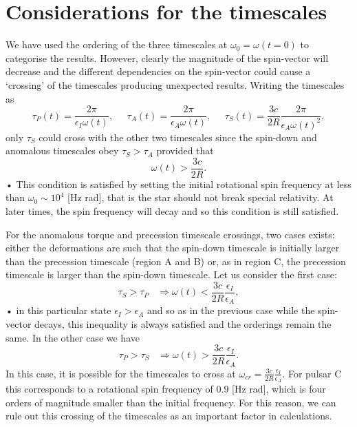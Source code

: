 \section{Considerations for the timescales}\label{sec: timescales}
We have used the ordering of the three timescales at $\omega_{0}=\omega(t=0)$
to categorise the results. However, clearly the magnitude of the spin-vector
will decrease and the different dependencies on the spin-vector could cause a
`crossing' of the timescales producing unexpected results. Writing the
timescales as 
\begin{equation}
\tau_{P}(t)=\frac{2\pi}{\epsilon_{I}\omega(t)}, \;\;\;\;\; 
\tau_{A}(t)=\frac{2\pi}{\epsilon_{A}\omega(t)},  \;\;\;\;\; 
\tau_{S}(t)=\frac{3c}{2R}\frac{2\pi}{\epsilon_{A}\omega(t)^{2}},
\end{equation}
only $\tau_{S}$ could cross with the other two timescales since the spin-down
and anomalous timescales obey $\tau_{S}>\tau_{A}$ provided that 
\begin{equation*}
\omega(t)>\frac{3c}{2R}.
\end{equation*}•
This condition is satisfied by setting the initial rotational spin frequency at
less than $\omega_{0} \sim 10^{4}$ [Hz rad], that is the star should not break
special relativity. At later times, the spin frequency will decay and so this
condition is still satisfied.

For the anomalous torque and precession timescale crossings, two cases exists:
either the deformations are such that the spin-down timescale is initially larger than
the precession timescale (region A and B) or, as in region C, the precession
timescale is larger than the spin-down timescale. Let us consider the first case:
\begin{equation}
\tau_{S}>\tau_{P} \;\;\; 
\Rightarrow \omega(t)<\frac{3c}{2R}\frac{\epsilon_{I}}{\epsilon_{A}},
\end{equation}•
in this particular state $\epsilon_{I}>\epsilon_{A}$ and so as in the previous
case while the spin-vector decays, this inequality is always satisfied and the
orderings remain the same. In the other case we have
\begin{equation}
\tau_{P}>\tau_{S} \;\;\; 
\Rightarrow \omega(t)>\frac{3c}{2R}\frac{\epsilon_{I}}{\epsilon_{A}}.
\end{equation}
In this case, it is possible for the timescales to cross at
$\omega_{cr}=\frac{3c}{2R}\frac{\epsilon_{I}}{\epsilon_{A}}$. For pulsar C this
corresponds to a rotational spin frequency of $0.9$ [Hz rad], which is four
orders of magnitude smaller than the initial frequency. For this reason, we can
rule out this crossing of the timescales as an important factor in
calculations. 


